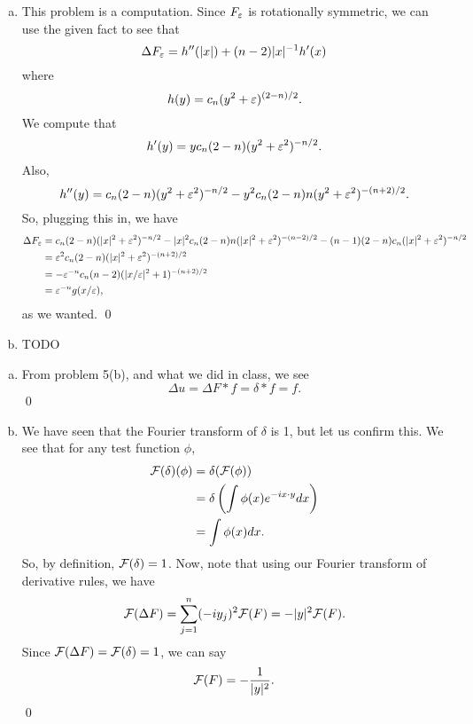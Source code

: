 \documentclass{article}
\begin{document}
\newpage
{} 
 \tri
\hop 
\solution
\begin{enumerate}[(a)]
    \item This problem is a computation. Since $F_\varepsilon$ is rotationally symmetric, we can use the given fact to see that 
    \[\Delta F_\varepsilon = h''(|x|) + (n-2)|x|{^{-1}} h'(x)\]
    where 
    \[h(y) = c_n(y^2+\varepsilon)^{(2-n)/2}.\]
    We compute that 
    \[h'(y) = yc_n(2-n)(y^2+\varepsilon^2)^{-n/2}.\]
    Also, 
    \[h''(y) = c_n(2-n)(y^2+\varepsilon^2)^{-n/2} - y^2c_n(2-n)n(y^2+\varepsilon^2)^{-(n+2)/2}.\]
    So, plugging this in, we have 
    \begin{align*}
        \Delta F_\varepsilon &= c_n (2-n)(|x|^2+\varepsilon^2)^{-n/2}- |x|^2c_n(2-n)n(|x|^2+\varepsilon^2)^{-(n-2)/2} - (n-1)(2-n)c_n(|x|^2 + \varepsilon^2)^{-n/2}\\
        &=\varepsilon^2 c_n(2-n)(|x|^2 + \varepsilon^2)^{-(n+2)/2}\\
        &=-\varepsilon^{-n} c_n(n-2)(|x/\varepsilon|^2 + 1)^{-(n+2)/2}\\
        &= \varepsilon^{-n}g(x/\varepsilon),
    \end{align*}
    as we wanted. \qed
    \item TODO
\end{enumerate}

\newpage
{} 
 \tri
\hop 
\solution
\begin{enumerate}[(a)]
    \item From problem 5(b), and what we did in class, we see 
    \[\Delta u = \Delta F * f = \delta * f  = f.\]
    \qed
    \item We have seen that the Fourier transform of $\delta$ is 1, but let us confirm this. We see that for any test function $\phi$, 
    \begin{align*}
        \F(\delta)(\phi) &= \delta(\F(\phi)) \\
        &= \delta\del{\int \phi(x)e^{-ix\cdot y}dx}\\
        &= \int \phi(x)dx.
    \end{align*}
    So, by definition, $\mathcal{F}(\delta) = 1$.
    \hop 
    Now, note that using our Fourier transform of derivative rules, we have 
    \[\mathcal{F}(\Delta F) = \sum_{j=1}^n (-iy_j)^2 \mathcal{F}(F) = -|y|^2\mathcal{F}(F).\]
    Since $\mathcal{F}(\Delta F) = \mathcal{F}(\delta) = 1$, we can say 
    \[\mathcal{F}(F) = -\frac{1}{|y|^2}.\]
    \qed
\end{enumerate}
\end{document}
